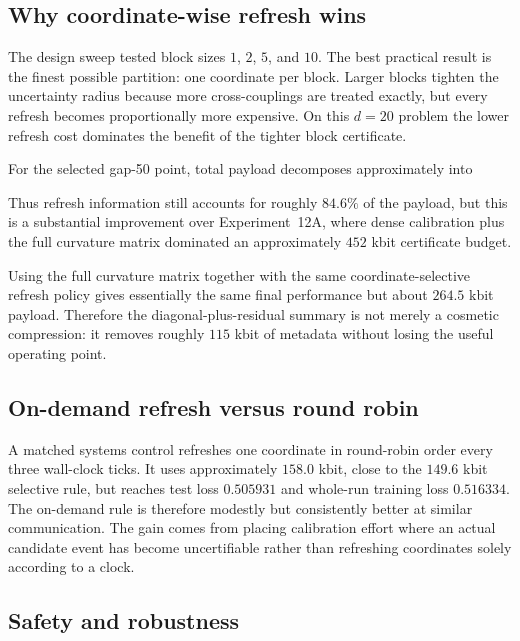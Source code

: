 \subsection{Why coordinate-wise refresh wins}

The design sweep tested block sizes $1$, $2$, $5$, and $10$. The best practical result is the finest possible partition: one coordinate per block. Larger blocks tighten the uncertainty radius because more cross-couplings are treated exactly, but every refresh becomes proportionally more expensive. On this $d=20$ problem the lower refresh cost dominates the benefit of the tighter block certificate.

For the selected gap-50 point, total payload decomposes approximately into
\begin{center}
\end{center}
Thus refresh information still accounts for roughly $84.6\%$ of the payload, but this is a substantial improvement over Experiment~12A, where dense calibration plus the full curvature matrix dominated an approximately $452$ kbit certificate budget.

Using the full curvature matrix together with the same coordinate-selective refresh policy gives essentially the same final performance but about $264.5$ kbit payload. Therefore the diagonal-plus-residual summary is not merely a cosmetic compression: it removes roughly $115$ kbit of metadata without losing the useful operating point.

\subsection{On-demand refresh versus round robin}

A matched systems control refreshes one coordinate in round-robin order every three wall-clock ticks. It uses approximately $158.0$ kbit, close to the $149.6$ kbit selective rule, but reaches test loss $0.505931$ and whole-run training loss $0.516334$. The on-demand rule is therefore modestly but consistently better at similar communication. The gain comes from placing calibration effort where an actual candidate event has become uncertifiable rather than refreshing coordinates solely according to a clock.

\subsection{Safety and robustness}

